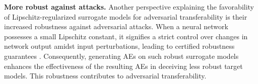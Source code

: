 \documentclass[letterpaper]{article} %
\theoremstyle{plain}
\theoremstyle{definition}
\newcommand{\fref}[1]{Fig.~\ref{#1}}
\begin{document}


\textbf{More robust against attacks.}
Another perspective explaining the favorability of Lipschitz-regularized surrogate models for adversarial transferability is their increased robustness against adversarial attacks. When a neural network possesses a small Lipschitz constant, it signifies a strict control over changes in network output amidst input perturbations, leading to certified robustness guarantees \cite{finlay2018improved, zhang2022rethinking}. Consequently, generating AEs on such robust surrogate models enhances the effectiveness of the resulting AEs in deceiving less robust target models. This robustness contributes to adversarial transferability.
\end{document}
